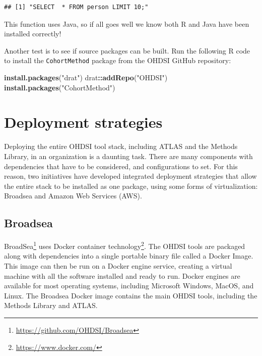 \documentclass[11pt]{book}
\newenvironment{Shaded}{\begin{snugshade}}{\end{snugshade}}
\newcommand{\KeywordTok}[1]{\textcolor[rgb]{0.13,0.29,0.53}{\textbf{#1}}}
\newcommand{\NormalTok}[1]{#1}
\newcommand{\OperatorTok}[1]{\textcolor[rgb]{0.81,0.36,0.00}{\textbf{#1}}}
\newcommand{\StringTok}[1]{\textcolor[rgb]{0.31,0.60,0.02}{#1}}
\let\rmarkdownfootnote\footnote%
\def\footnote{\protect\rmarkdownfootnote}
\theoremstyle{definition}
\theoremstyle{definition}
\theoremstyle{definition}
\theoremstyle{remark}
\begin{document}
\begin{verbatim}
## [1] "SELECT  * FROM person LIMIT 10;"
\end{verbatim}

This function uses Java, so if all goes well we know both R and Java have been installed correctly!

Another test is to see if source packages can be built. Run the following R code to install the \texttt{CohortMethod} package from the OHDSI GitHub repository:

\begin{Shaded}
\begin{Highlighting}[]
\KeywordTok{install.packages}\NormalTok{(}\StringTok{"drat"}\NormalTok{)}
\NormalTok{drat}\OperatorTok{::}\KeywordTok{addRepo}\NormalTok{(}\StringTok{"OHDSI"}\NormalTok{)}
\KeywordTok{install.packages}\NormalTok{(}\StringTok{"CohortMethod"}\NormalTok{)}
\end{Highlighting}
\end{Shaded}

\hypertarget{deployment-strategies}{%
\section{Deployment strategies}\label{deployment-strategies}}

Deploying the entire OHDSI tool stack, including ATLAS and the Methods Library, in an organization is a daunting task. There are many components with dependencies that have to be considered, and configurations to set. For this reason, two initiatives have developed integrated deployment strategies that allow the entire stack to be installed as one package, using some forms of virtualization: Broadsea and Amazon Web Services (AWS). 

\hypertarget{broadsea}{%
\subsection{Broadsea}\label{broadsea}}

BroadSea\footnote{\url{https://github.com/OHDSI/Broadsea}} uses Docker container technology\footnote{\url{https://www.docker.com/}}. The OHDSI tools are packaged along with dependencies into a single portable binary file called a Docker Image. This image can then be run on a Docker engine service, creating a virtual machine with all the software installed and ready to run. Docker engines are available for most operating systems, including Microsoft Windows, MacOS, and Linux. The Broadsea Docker image contains the main OHDSI tools, including the Methods Library and ATLAS. 
\end{document}

